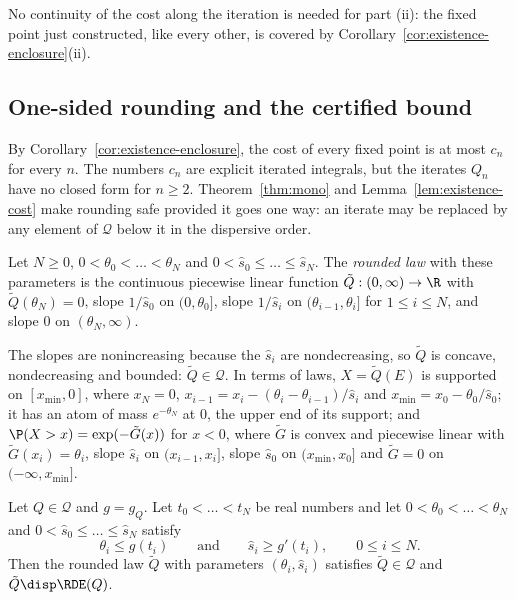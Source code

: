 No continuity of the cost along the iteration is needed for part (ii): the fixed point just
constructed, like every other, is covered by Corollary~\ref{cor:existence-enclosure}(ii).

\subsection{One-sided rounding and the certified bound}\label{subsec:existence-rounding}

By Corollary~\ref{cor:existence-enclosure}, the cost of every fixed point is at most $c_n$ for
every $n$. The numbers $c_n$ are explicit iterated integrals, but the iterates $Q_n$ have no
closed form for $n\ge2$. Theorem~\ref{thm:mono} and Lemma~\ref{lem:existence-cost} make
rounding safe provided it goes one way: an iterate may be replaced by any element of
$\mathcal{Q}$ below it in the dispersive order.

\begin{definition}\label{def:existence-rounded}
Let $N\ge0$, $0<\theta_0<\dots<\theta_N$ and $0<\hat s_0\le\dots\le\hat s_N$. The \emph{rounded
law} with these parameters is the continuous piecewise linear function
$\tilde Q:(0,\infty)\to\R$ with $\tilde Q(\theta_N)=0$, slope $1/\hat s_0$ on $(0,\theta_0]$,
slope $1/\hat s_i$ on $(\theta_{i-1},\theta_i]$ for $1\le i\le N$, and slope $0$ on
$(\theta_N,\infty)$.
\end{definition}

The slopes are nonincreasing because the $\hat s_i$ are nondecreasing, so $\tilde Q$ is
concave, nondecreasing and bounded: $\tilde Q\in\mathcal{Q}$. In terms of laws,
$X=\tilde Q(E)$ is supported on $[x_{\min},0]$, where $x_N=0$,
$x_{i-1}=x_i-(\theta_i-\theta_{i-1})/\hat s_i$ and $x_{\min}=x_0-\theta_0/\hat s_0$; it has an
atom of mass $e^{-\theta_N}$ at $0$, the upper end of its support; and
$\P(X>x)=\exp(-\tilde G(x))$ for $x<0$, where $\tilde G$ is convex and piecewise linear with
$\tilde G(x_i)=\theta_i$, slope $\hat s_i$ on $(x_{i-1},x_i]$, slope $\hat s_0$ on
$(x_{\min},x_0]$ and $\tilde G=0$ on $(-\infty,x_{\min}]$.

\begin{lemma}\label{lem:existence-rounding}
Let $Q\in\mathcal{Q}$ and $g=g_Q$. Let $t_0<\dots<t_N$ be real numbers and let
$0<\theta_0<\dots<\theta_N$ and $0<\hat s_0\le\dots\le\hat s_N$ satisfy
\[
  \theta_i\le g(t_i)\qquad\text{and}\qquad\hat s_i\ge g'(t_i),\qquad 0\le i\le N .
\]
Then the rounded law $\tilde Q$ with parameters $(\theta_i,\hat s_i)$ satisfies
$\tilde Q\in\mathcal{Q}$ and $\tilde Q\disp\RDE(Q)$.
\end{lemma}

